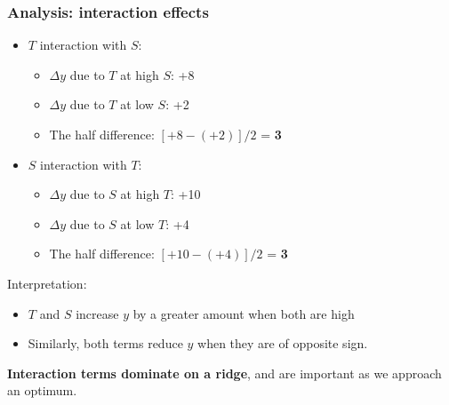 \begin{frame}\frametitle{Analysis: interaction effects}
	\begin{itemize}
		\item	$T$ interaction with $S$:
		\begin{itemize}
			\item	$\Delta y$ due to $T$ at high $S$: +8
			\item	$\Delta y$ due to $T$ at low $S$: +2
			\item	The half difference: $[+8 - (+2)]/2$ = \textbf{3}
		\end{itemize}
		\item	$S$ interaction with $T$:
		\begin{itemize}
			\item	$\Delta y$ due to $S$ at high $T$: +10
			\item	$\Delta y$ due to $S$ at low $T$: +4
			\item	The half difference: $[+10 - (+4)]/2$ = \textbf{3}
		\end{itemize}
	\end{itemize}

	Interpretation:
	\begin{itemize}
		\item	$T$ and $S$ increase $y$ by a greater amount when both are high
		\item	Similarly, both terms reduce $y$ when they are of opposite sign.
	\end{itemize}

	\textbf{Interaction terms dominate on a ridge}, and are important as we approach an optimum.
\end{frame}

